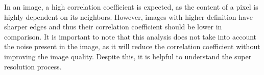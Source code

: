          In an image, a high correlation coefficient is expected, as the content of a pixel is highly dependent on its neighbors. However, images with higher definition have sharper edges and thus their correlation coefficient should be lower in comparison. It is important to note that this analysis does not take into account the noise present in the image, as it will reduce the correlation coefficient without improving the image quality. Despite this, it is helpful to understand the super resolution process.
         

\clearpage

        

        
        
